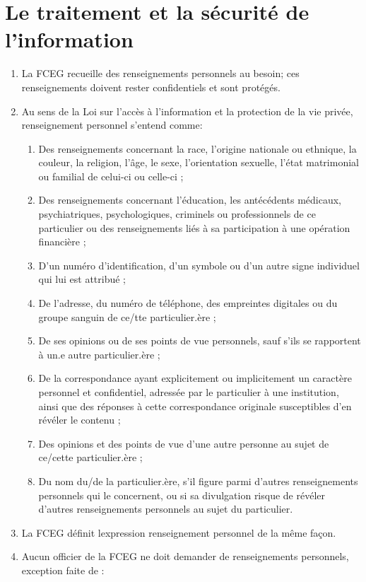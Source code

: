 \section{Le traitement et la sécurité de l'information}
\label{le-traitement-et-la-securite-de-l-information}

\begin{enumerate}
 \item
  La FCEG recueille des renseignements personnels au besoin; ces renseignements doivent rester confidentiels et sont protégés.
 \item
  Au sens de la Loi sur l'accès à l'information et la protection de la vie privée, renseignement personnel s'entend comme:

  \begin{enumerate}
   \item
    Des renseignements concernant la race, l'origine nationale ou ethnique, la couleur, la religion, l'âge, le sexe, l'orientation sexuelle, l'état matrimonial ou familial de celui-ci ou celle-ci ;
   \item
    Des renseignements concernant l'éducation, les antécédents médicaux, psychiatriques, psychologiques, criminels ou professionnels de ce particulier ou des renseignements liés à sa participation à une opération financière ;
   \item
    D'un numéro d'identification, d'un symbole ou d'un autre signe individuel qui lui est attribué ;
   \item
    De l'adresse, du numéro de téléphone, des empreintes digitales ou du groupe sanguin de ce/tte particulier.ère ;
   \item
    De ses opinions ou de ses points de vue personnels, sauf s'ils se rapportent à un.e autre particulier.ère ;
   \item
    De la correspondance ayant explicitement ou implicitement un caractère personnel et confidentiel, adressée par le particulier à une institution, ainsi que des réponses à cette correspondance originale susceptibles d'en révéler le contenu ;
   \item
    Des opinions et des points de vue d'une autre personne au sujet de ce/cette particulier.ère ;
   \item
    Du nom du/de la particulier.ère, s'il figure parmi d'autres renseignements personnels qui le concernent, ou si sa divulgation risque de révéler d'autres renseignements personnels au sujet du particulier.
  \end{enumerate}
 \item
  La FCEG définit l\textquotesingle expression renseignement personnel de la même façon.
 \item
  Aucun officier de la FCEG ne doit demander de renseignements personnels, exception faite de :


\end{enumerate}
